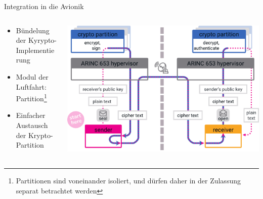 \begin{frame}[c]{Integration in die Avionik}
  \begin{columns}[fullwidth,c]
    \begin{column}{.4\linewidth}
      \begin{itemize}
        \item Bündelung der Kyrypto-Implementierung
        \item Modul der Luftfahrt: Partition\footnote{Partitionen sind voneinander isoliert, und dürfen daher in der Zulassung separat betrachtet werden}
        \item Einfacher Austausch der Krypto-Partition
      \end{itemize}
      \vspace{8.5em} %
    \end{column}%
    \begin{column}{.6\linewidth}
      \includegraphics[width=\linewidth]{graphics/crypto partition}
    \end{column}
  \end{columns}
\end{frame}


